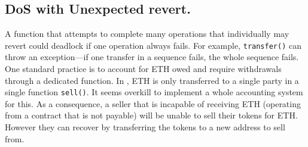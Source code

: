 \subsection{DoS with Unexpected revert.}\label{subsec:rvt}

A function that attempts to complete many operations that individually may revert could deadlock if one operation always fails. For example, \texttt{transfer()} can throw an exception---if one transfer in a sequence fails, the whole sequence fails. One standard practice is to account for ETH owed and require withdrawals through a dedicated function. In \sys, ETH is only transferred to a single party in a single function \texttt{sell()}. It seems overkill to implement a whole accounting system for this. As a consequence, a seller that is incapable of receiving ETH (\eg operating from a contract that is not payable) will be unable to sell their tokens for ETH. However they can recover by transferring the tokens to a new address to sell from. 

